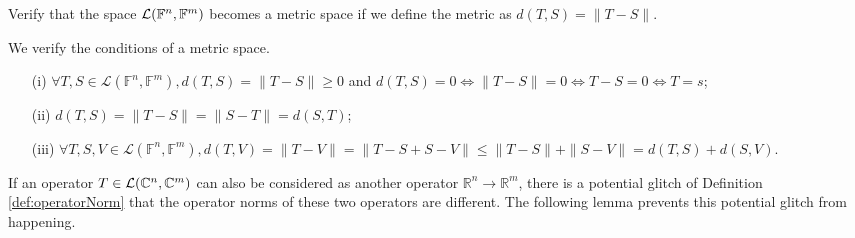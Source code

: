 \begin{exc}
  Verify that the space ${\cal L}(\mathbb{F}^n,\mathbb{F}^m)$
  becomes a metric space
  if we define the metric as $d(T,S)=\|T-S\|$.
\end{exc}
\begin{solution}
  We verify the conditions of a metric space.
  \begin{itemize}\itemsep0em
  \item[(i)] $\forall T, S \in \mathcal{L}(\mathbb{F}^n,
    \mathbb{F}^m),
    d(T, S) = \|T - S\| \geq 0 $
    and $d(T, S) = 0 \iff \|T - S\| = 0 \iff T - S = 0 \iff T = s$;
  \item[(ii)] $d(T, S) = \|T - S\| = \|S - T\| = d(S, T)$;
  \item[(iii)] $\forall T, S ,V \in \mathcal{L}(\mathbb{F}^n,
    \mathbb{F}^m),
    d(T, V) = \|T - V\| = \|T - S + S - V\| \leq \|T - S\| + \|S - V\|
    = d(T, S) + d(S, V)$.
  \end{itemize}
\end{solution}

\begin{rem}
  If an operator $T\in{\cal L}(\mathbb{C}^n,\mathbb{C}^m)$
  can also be considered as another operator
  $\mathbb{R}^n \rightarrow \mathbb{R}^m$, 
  there is a potential glitch of Definition \ref{def:operatorNorm}
  that the operator norms
  of these two operators are different.
  The following lemma prevents this potential glitch
  from happening.
\end{rem}

